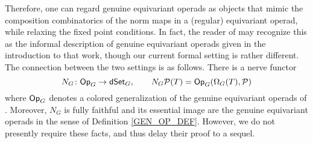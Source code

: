 \documentclass[a4paper,10pt
,draft
]{article}%
\begin{document}
\begin{remark}
Therefore, one can regard genuine equivariant operads as objects that mimic the composition combinatorics of the  norm maps in a (regular) equivariant operad, while relaxing the fixed point conditions.
In fact, the reader of \cite{BP17} may recognize this as the informal description of genuine equivariant operads given in the introduction to that work,
though our current formal setting is rather different.
The connection between the two settings is as follows.
There is a nerve functor
\begin{equation}\label{NG EQ}
N_G \colon \mathsf{Op}_G \to \mathsf{dSet}_G, \qquad N_G\mathcal{P}(T) = \mathsf{Op}_G(\Omega_G(T), \mathcal{P})
\end{equation}
where $\mathsf{Op}_G$ denotes a colored generalization of the genuine equivariant operads of \cite{BP17}. Moreover, $N_G$ is fully faithful and its essential image are the genuine equivariant operads in the sense of Definition \ref{GEN_OP_DEF}.
However, we do not presently require these facts, and thus delay their proof to a sequel.
\end{remark}




\end{document}
